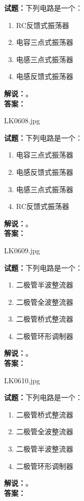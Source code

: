 \documentclass{ctexbook}
\begin{document}
\noindent\textbf{试题：}下列电路是一个：
\begin{enumerate}[leftmargin=3em]
\item RC反馈式振荡器
\item 电容三点式振荡器
\item 电感三点式振荡器
\item 电感反馈式振荡器
\end{enumerate}
\noindent\textbf{解说：}\textbf{}。\\\noindent\textbf{答案：}

\bigskip

LK0608.jpg


\noindent\textbf{试题：}下列电路是一个：
\begin{enumerate}[leftmargin=3em]
\item 电容三点式振荡器
\item 电感反馈式振荡器
\item 电感三点式振荡器
\item RC反馈式振荡器
\end{enumerate}
\noindent\textbf{解说：}\textbf{}。\\\noindent\textbf{答案：}

\bigskip

LK0609.jpg


\noindent\textbf{试题：}下列电路是一个：
\begin{enumerate}[leftmargin=3em]
\item 二极管半波整流器
\item 二极管全波整流器
\item 二极管桥式整流器
\item 二极管环形调制器
\end{enumerate}
\noindent\textbf{解说：}\textbf{}。\\\noindent\textbf{答案：}

\bigskip

LK0610.jpg


\noindent\textbf{试题：}下列电路是一个：
\begin{enumerate}[leftmargin=3em]
\item 二极管桥式整流器
\item 二极管全波整流器
\item 二极管半波整流器
\item 二极管环形调制器
\end{enumerate}
\noindent\textbf{解说：}\textbf{}。\\\noindent\textbf{答案：}

\bigskip
\end{document}
